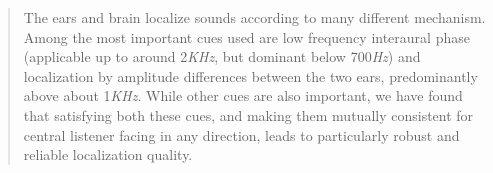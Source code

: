 \begin{quotation}
The ears and brain localize sounds according to many different mechanism. Among the most important cues used are low frequency interaural phase (applicable up to around 2\emph{KHz}, but dominant below 700\emph{Hz}) and localization by amplitude differences between the two ears, predominantly above about 1\emph{KHz}. While other cues are also important, we have found that satisfying both these cues, and making them mutually consistent for central listener facing in any direction, leads to particularly robust and reliable localization quality.\cite{mg92pdmsss}
\end{quotation}
%
%
%
%
%
%
%
